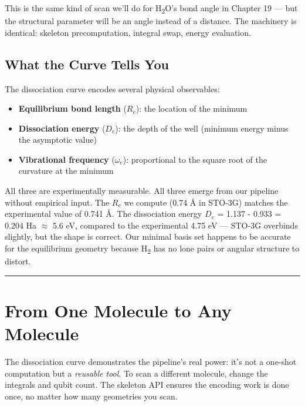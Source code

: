 \documentclass[
  11pt,
  oneside]{book}
\providecommand{\tightlist}{%
  \setlength{\itemsep}{0pt}\setlength{\parskip}{0pt}}
\begin{document}
This is the same kind of scan we'll do for H\textsubscript{2}O's bond angle in Chapter
19 --- but the structural parameter will be an angle instead of a
distance. The machinery is identical: skeleton precomputation, integral
swap, energy evaluation.

\subsection{What the Curve Tells You}\label{what-the-curve-tells-you}

The dissociation curve encodes several physical observables:

\begin{itemize}
\tightlist
\item
  \textbf{Equilibrium bond length} (\(R_e\)): the location of the
  minimum
\item
  \textbf{Dissociation energy} (\(D_e\)): the depth of the well (minimum
  energy minus the asymptotic value)
\item
  \textbf{Vibrational frequency} (\(\omega_e\)): proportional to the
  square root of the curvature at the minimum
\end{itemize}

All three are experimentally measurable. All three emerge from our
pipeline without empirical input. The \(R_e\) we compute (0.74 Å in
STO-3G) matches the experimental value of 0.741 Å. The dissociation
energy \(D_e\) = 1.137 - 0.933 = 0.204 Ha $\approx$ 5.6 eV, compared to the
experimental 4.75 eV --- STO-3G overbinds slightly, but the shape is
correct. Our minimal basis set happens to be accurate for the
equilibrium geometry because H\textsubscript{2} has no lone pairs or angular structure
to distort.

\begin{center}\rule{0.5\linewidth}{0.5pt}\end{center}

\section{From One Molecule to Any
Molecule}\label{from-one-molecule-to-any-molecule}

The dissociation curve demonstrates the pipeline's real power: it's not
a one-shot computation but a \emph{reusable tool}. To scan a different
molecule, change the integrals and qubit count. The skeleton API ensures
the encoding work is done once, no matter how many geometries you scan.
\end{document}
